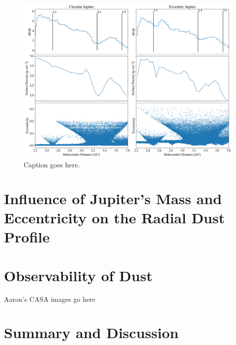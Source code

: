 \documentclass[onecolumn]{aastex63}
\begin{document}
\begin{figure}
    \includegraphics[width=\textwidth]{figures/coll_hist_r.png}
    \caption{Caption goes here.\label{fig:coll_hist_r}}
\end{figure}

\section{Influence of Jupiter's Mass and Eccentricity on the Radial Dust Profile}

\section{Observability of Dust} \label{sec:dust}

Aaron's CASA images go here

\section{Summary and Discussion} \label{sec:discuss}



\clearpage
\end{document}
